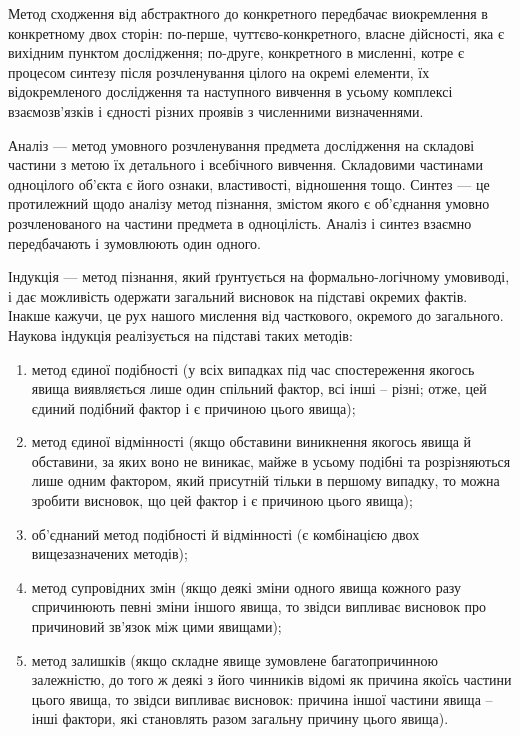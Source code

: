 Метод сходження від абстрактного до конкретного передбачає
виокремлення в конкретному двох сторін: по-перше, чуттєво-конкретного,
власне дійсності, яка є вихідним пунктом дослідження; по-друге, конкретного в
мисленні, котре є процесом синтезу після розчленування цілого на окремі
елементи, їх відокремленого дослідження та наступного вивчення в усьому
комплексі взаємозв’язків і єдності різних проявів з численними визначеннями.

Аналіз --- метод умовного розчленування предмета дослідження на складові
частини з метою їх детального і всебічного вивчення. Складовими частинами
одноцілого об’єкта є його ознаки, властивості, відношення тощо. Синтез --- це
протилежний щодо аналізу метод пізнання, змістом якого є об’єднання умовно
розчленованого на частини предмета в одноцілість. Аналіз і синтез взаємно
передбачають і зумовлюють один одного.

Індукція --- метод пізнання, який ґрунтується на формально-логічному
умовиводі, і дає можливість одержати загальний висновок на підставі окремих
фактів. Інакше кажучи, це рух нашого мислення від часткового, окремого до
загального. Наукова індукція реалізується на підставі таких методів:
\begin{enumerate}
	\item метод єдиної подібності (у всіх випадках під час спостереження якогось
	явища виявляється лише один спільний фактор, всі інші – різні; отже, цей
	єдиний подібний фактор і є причиною цього явища);
	
	\item метод єдиної відмінності (якщо обставини виникнення якогось явища й
	обставини, за яких воно не виникає, майже в усьому подібні та розрізняються
	лише одним фактором, який присутній тільки в першому випадку, то можна
	зробити висновок, що цей фактор і є причиною цього явища);

	\item об’єднаний метод подібності й відмінності (є комбінацією двох
	вищезазначених методів);

	\item метод супровідних змін (якщо деякі зміни одного явища кожного разу
	спричинюють певні зміни іншого явища, то звідси випливає висновок про
	причиновий зв’язок між цими явищами);

	\item метод залишків (якщо складне явище зумовлене багатопричинною
	залежністю, до того ж деякі з його чинників відомі як причина якоїсь частини
	цього явища, то звідси випливає висновок: причина іншої частини явища – інші
	фактори, які становлять разом загальну причину цього явища).
\end{enumerate}

